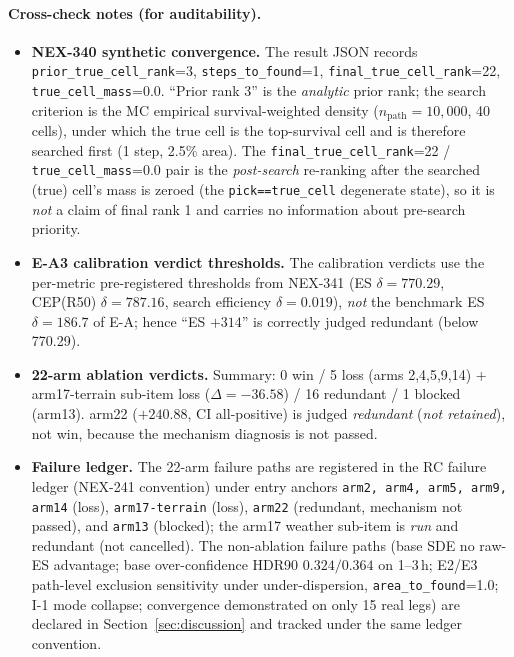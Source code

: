\documentclass[11pt]{article}
\begin{document}
\paragraph{Cross-check notes (for auditability).}
\begin{itemize}
\item \textbf{NEX-340 synthetic convergence.} The result JSON records
\texttt{prior\_true\_cell\_rank}=3, \texttt{steps\_to\_found}=1,
\texttt{final\_true\_cell\_rank}=22, \texttt{true\_cell\_mass}=0.0.  ``Prior
rank 3'' is the \emph{analytic} prior rank; the search criterion is the MC
empirical survival-weighted density ($n_{\mathrm{path}}{=}10{,}000$, 40
cells), under which the true cell is the top-survival cell and is therefore
searched first (1 step, 2.5\% area).  The
\texttt{final\_true\_cell\_rank}=22 / \texttt{true\_cell\_mass}=0.0 pair is
the \emph{post-search} re-ranking after the searched (true) cell's mass is
zeroed (the \texttt{pick==true\_cell} degenerate state), so it is \emph{not}
a claim of final rank 1 and carries no information about pre-search priority.
\item \textbf{E-A3 calibration verdict thresholds.} The calibration
verdicts use the per-metric pre-registered thresholds from NEX-341
(ES $\delta=770.29$, CEP(R50) $\delta=787.16$, search efficiency
$\delta=0.019$), \emph{not} the benchmark ES $\delta=186.7$ of E-A; hence
``ES $+314$'' is correctly judged redundant (below 770.29).
\item \textbf{22-arm ablation verdicts.} Summary: 0 win / 5 loss (arms
2,4,5,9,14) + arm17-terrain sub-item loss ($\Delta=-36.58$) / 16 redundant /
1 blocked (arm13).  arm22 ($+240.88$, CI all-positive) is judged
\emph{redundant} (\emph{not retained}), not win, because the mechanism
diagnosis is not passed.
\item \textbf{Failure ledger.} The 22-arm failure paths are registered in the
RC failure ledger (NEX-241 convention) under entry anchors \texttt{arm2,
arm4, arm5, arm9, arm14} (loss), \texttt{arm17-terrain} (loss),
\texttt{arm22} (redundant, mechanism not passed), and \texttt{arm13}
(blocked); the arm17 weather sub-item is \emph{run} and redundant (not
cancelled).  The non-ablation failure paths (base SDE no raw-ES advantage;
base over-confidence HDR90 $0.324/0.364$ on 1--3\,h; E2/E3 path-level
exclusion sensitivity under under-dispersion, \texttt{area\_to\_found}=1.0;
I-1 mode collapse; convergence demonstrated on only 15 real legs) are
declared in Section~\ref{sec:discussion} and tracked under the same ledger
convention.
\end{itemize}
\end{document}

